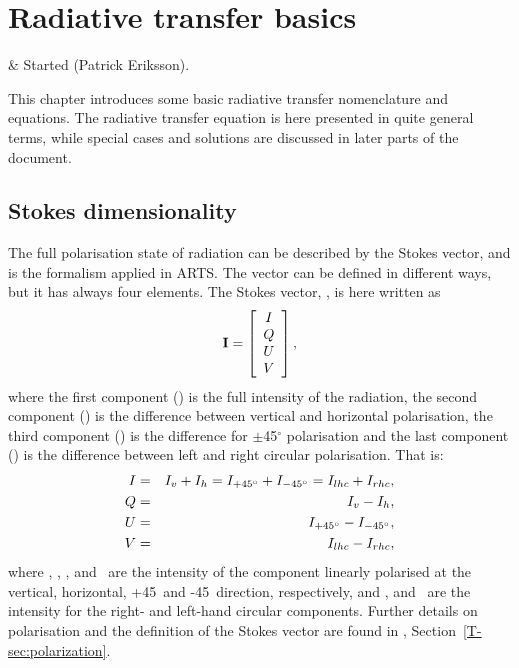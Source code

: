 \chapter{Radiative transfer basics}
 \label{sec:rte_basics}


  & Started (Patrick Eriksson).\\
 \stophistory

 This chapter introduces some basic radiative transfer nomenclature and
 equations. The radiative transfer equation is here presented in quite general
 terms, while special cases and solutions are discussed in later parts of the
 document. 


\section{Stokes dimensionality}
\label{sec:fm_defs:polarisation}

The full polarisation state of radiation can be described by the Stokes vector,
and is the formalism applied in ARTS. The vector can be defined in different
ways, but it has always four elements. The Stokes vector, \StoVec, is here
written as
\begin{equation}
  \label{eq:fm_defs:stokevec}
  {\bf I} = \left[
  \begin{array}{c}
   I\\ Q \\ U\\ V
  \end{array}
  \right],
\end{equation}
where the first component (\StoI) is the full intensity of the
radiation, the second component (\StoQ) is the difference between
vertical and horizontal polarisation, the third component (\StoU) is the
difference for $\pm$45$^\circ$ polarisation and the last component
(\StoV) is the difference between left and right circular polarisation.
That is:
\begin{eqnarray}
  I &=&   I_v + I_h = I_{+45^\circ} + I_{-45^\circ} = I_{lhc} + I_{rhc}, \\
  Q &=&   I_v - I_h,                                 \\
  U &=&   I_{+45^\circ} - I_{-45^\circ},                             \\
  V &=&   I_{lhc} - I_{rhc},                             
\end{eqnarray}
where \Iv, \Ih, \Ipff, and \Imff\ are the intensity of the component linearly
polarised at the vertical, horizontal, +45\degree\ and -45\degree\ direction,
respectively, and \Irhc, and \Ilhc\ are the intensity for the right- and
left-hand circular components. Further details on polarisation and the
definition of the Stokes vector are found in \theory,
Section~\ref{T-sec:polarization}.

